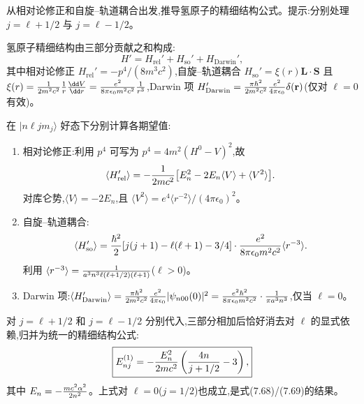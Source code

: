 \begin{question}
从相对论修正和自旋--轨道耦合出发,推导氢原子的精细结构公式。提示:分别处理 $j=\ell+1/2$ 与 $j=\ell-1/2$。
\end{question}
\begin{solution}
氢原子精细结构由三部分贡献之和构成:
\[
H' = H_{\text{rel}}' + H_{\text{so}}' + H_{\text{Darwin}}',
\]
其中相对论修正 $H_{\text{rel}}'=-p^4/(8m^3c^2)$,自旋--轨道耦合 $H_{\text{so}}'=\xi(r)\mathbf L\cdot\mathbf S$ 且 $\xi(r)={1\over2m^2c^2}{1\over r}{\dd V\over\dd r}={e^2\over8\pi\epsilon_0 m^2c^2}{1\over r^3}$,Darwin 项 $H_{\text{Darwin}}'={\pi\hbar^2\over2m^2c^2}{e^2\over4\pi\epsilon_0}\delta(\mathbf r)$(仅对 $\ell=0$ 有效)。

在 $|n\ell j m_j\rangle$ 好态下分别计算各期望值:
\begin{enumerate}
\item 相对论修正:利用 $p^4$ 可写为 $p^4=4m^2(H^0-V)^2$,故
\[
\langle H_{\text{rel}}'\rangle=-{1\over2mc^2}\bigl[E_n^2-2E_n\langle V\rangle+\langle V^2\rangle\bigr].
\]
对库仑势,$\langle V\rangle=-2E_n$,且 $\langle V^2\rangle=e^4\langle r^{-2}\rangle/(4\pi\epsilon_0)^2$。
\item 自旋--轨道耦合:
\[
\langle H_{\text{so}}'\rangle = {\hbar^2\over2}[j(j+1)-\ell(\ell+1)-3/4]\cdot{e^2\over8\pi\epsilon_0 m^2c^2}\langle r^{-3}\rangle.
\]
利用 $\langle r^{-3}\rangle={1\over a^3 n^3\ell(\ell+1/2)(\ell+1)}$($\ell>0$)。
\item Darwin 项:$\langle H_{\text{Darwin}}'\rangle = {\pi\hbar^2\over2m^2c^2}{e^2\over4\pi\epsilon_0}|\psi_{n00}(0)|^2 = {e^2\hbar^2\over8\pi\epsilon_0 m^2c^2}\cdot{1\over\pi a^3 n^3}$,仅当 $\ell=0$。
\end{enumerate}

对 $j=\ell+1/2$ 和 $j=\ell-1/2$ 分别代入,三部分相加后恰好消去对 $\ell$ 的显式依赖,归并为统一的精细结构公式:
\[
\boxed{E_{nj}^{(1)}=-{E_n^2\over2mc^2}\left({4n\over j+1/2}-3\right),}
\]
其中 $E_n=-{mc^2\alpha^2\over2n^2}$。上式对 $\ell=0$($j=1/2$)也成立,是式(7.68)/(7.69)的结果。
\end{solution}

